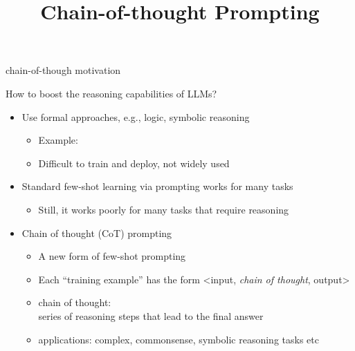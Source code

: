 



\newcommand{\learninggoals}{
\item illustrate chain-of-thought and point out the benefits it brings to LLMs
\item illustrate tree-of-thought and point out the benefits it brings to LLMs 
}

\def\myblue#1{\textcolor{texblue}{#1}}

\title{Chain-of-thought Prompting}
\date{}




\begin{vbframe}{chain-of-though motivation}

\vfill

How to boost the reasoning capabilities of LLMs? 

\begin{itemize}
\item Use formal approaches, e.g., logic, symbolic reasoning
    \begin{itemize}
    \item Example: 
\item Difficult to train and deploy, not widely used
    \end{itemize}
\item Standard few-shot learning via prompting works for many tasks
    \begin{itemize}
    \item Still, it works poorly for many tasks that require reasoning
    \end{itemize}
\item Chain of thought (CoT) prompting
    \begin{itemize}
    \item A new form of few-shot prompting
    \item Each ``training example'' has the form <input, \textit{chain of thought}, output>
    \item chain of thought:\\ series of reasoning steps that
    lead to the final answer
    \item applications: complex, commonsense, symbolic
    reasoning tasks etc
    \end{itemize}

\end{itemize}

\vfill

\end{vbframe}

